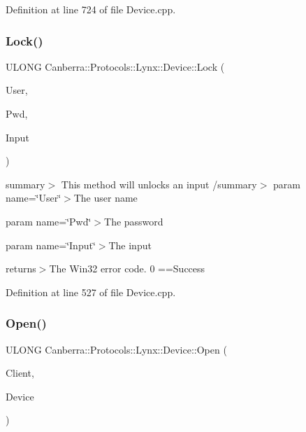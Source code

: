 Definition at line 724 of file Device.\+cpp.

\mbox{\label{class_canberra_1_1_protocols_1_1_lynx_1_1_device_ad6b49e66d88c9624d344532c8c0f16af_ad6b49e66d88c9624d344532c8c0f16af}} 
\subsubsection{\texorpdfstring{Lock()}{Lock()}}
{\footnotesize\ttfamily U\+L\+O\+NG Canberra\+::\+Protocols\+::\+Lynx\+::\+Device\+::\+Lock (\begin{DoxyParamCaption}\item[{const \hyperlink{class_canberra_1_1_utility_1_1_core_1_1_string}{Canberra\+::\+Utility\+::\+Core\+::\+String} \&}]{User,  }\item[{const \hyperlink{class_canberra_1_1_utility_1_1_core_1_1_string}{Canberra\+::\+Utility\+::\+Core\+::\+String} \&}]{Pwd,  }\item[{U\+S\+H\+O\+RT}]{Input }\end{DoxyParamCaption})}

summary$>$ This method will unlocks an input /summary$>$ param name=\char`\"{}\+User\char`\"{}$>$The user name

param name=\char`\"{}\+Pwd\char`\"{}$>$The password

param name=\char`\"{}\+Input\char`\"{}$>$The input

returns$>$The Win32 error code. 0 ==Success

Definition at line 527 of file Device.\+cpp.

\mbox{\label{class_canberra_1_1_protocols_1_1_lynx_1_1_device_aece855a20d43a1676ec6ca0ab9917a49_aece855a20d43a1676ec6ca0ab9917a49}} 
\subsubsection{\texorpdfstring{Open()}{Open()}}
{\footnotesize\ttfamily U\+L\+O\+NG Canberra\+::\+Protocols\+::\+Lynx\+::\+Device\+::\+Open (\begin{DoxyParamCaption}\item[{const \hyperlink{class_canberra_1_1_utility_1_1_core_1_1_string}{Canberra\+::\+Utility\+::\+Core\+::\+String} \&}]{Client,  }\item[{const \hyperlink{class_canberra_1_1_utility_1_1_core_1_1_string}{Canberra\+::\+Utility\+::\+Core\+::\+String} \&}]{Device }\end{DoxyParamCaption})}

